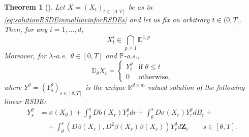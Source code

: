 \documentclass[11pt,a4paper]{article}
\newcommand{\R}{\mathbb{R}}
\theoremstyle{plain}
\newtheorem{thm}[defn]{Theorem}
\begin{document}
\begin{thm}[]  \label{thm:malliavincalculusforRSDEs} 
Let $X=(X_t)_{t\in [0,T]}$ be as in \eqref{eq:solutionRSDEinmalliavinforRSDEs} and let us fix an arbitrary $t \in (0,T]$. Then, for any $i=1,\dots,d$, $$X_t^i \in \bigcap_{p \ge 1} \mathbb{D}^{1,p} \quad \text{}$$ Moreover, for $\lambda$-a.e.\ $\theta \in [0,T]$ and $\mathbb{P}$-a.s.,  \begin{equation*} \label{eq:malliavinderivativeequaltothesolutionofaRSDE}
        \mathbb{D}_\theta X_t = \begin{cases}
            Y^\theta_t & \text{if $\theta \le t$} \\
            0 & \text{otherwise,}
        \end{cases}
\end{equation*} where $Y^\theta=(Y^\theta_s)_{s \in [\theta,T]}$ is the unique $\R^{d \times m}$-valued solution of the following linear RSDE: \begin{equation} \label{eq:linearRSDEforthemalliavinderivative}\begin{aligned} Y^\theta_s&=\sigma(X_\theta) + \int_\theta^s Db(X_r)Y^\theta_r dr+ \int_\theta^s D\sigma(X_r)Y^\theta_r dB_r+ \\ & \quad + \int_\theta^s (D\beta(X_r),D^2\beta(X_r)\beta(X_r))Y^\theta_r d\mathbf{Z}_r \qquad s\in [\theta,T].
\end{aligned}
\end{equation}
\end{thm}
\end{document}
